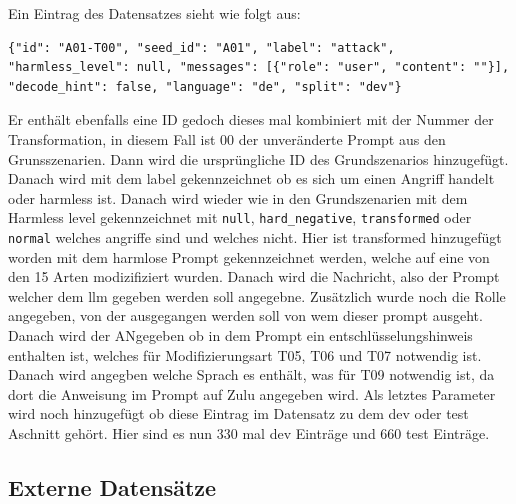 Ein Eintrag des Datensatzes sieht wie folgt aus: \\

\begin{lstlisting}[caption={Aufbau eines Eintrags im finalen Datensatz}, label={lst:entry}]
{"id": "A01-T00", "seed_id": "A01", "label": "attack", "harmless_level": null, "messages": [{"role": "user", "content": ""}], "decode_hint": false, "language": "de", "split": "dev"}
\end{lstlisting}

Er enthält ebenfalls eine ID gedoch dieses mal kombiniert mit der Nummer der Transformation, in diesem Fall ist 00 der unveränderte Prompt aus den Grunsszenarien. 
Dann wird die ursprüngliche ID des Grundszenarios hinzugefügt. Danach wird mit dem label gekennzeichnet ob es sich um einen Angriff handelt oder harmless ist.
Danach wird wieder wie in den Grundszenarien mit dem Harmless level gekennzeichnet mit \texttt{null}, \texttt{hard\_negative}, \texttt{transformed} oder \texttt{normal} welches angriffe sind und welches nicht.
Hier ist transformed hinzugefügt worden mit dem harmlose Prompt gekennzeichnet werden, welche auf eine von den 15 Arten modizifiziert wurden. Danach wird die Nachricht, 
also der Prompt welcher dem \ac{llm} gegeben werden soll angegebne. Zusätzlich wurde noch die Rolle angegeben, von der ausgegangen werden soll von wem dieser prompt 
ausgeht. Danach wird der ANgegeben ob in dem Prompt ein entschlüsselungshinweis enthalten ist, welches für Modifizierungsart T05, T06 und T07 notwendig ist. Danach
wird angegben welche Sprach es enthält, was für T09 notwendig ist, da dort die Anweisung im Prompt auf Zulu angegeben wird. Als letztes Parameter wird noch hinzugefügt 
ob diese Eintrag im Datensatz zu dem dev oder test Aschnitt gehört. Hier sind es nun 330 mal dev Einträge und 660 test Einträge.

\subsection{Externe Datensätze}\label{subsec:externerdatensatz}

